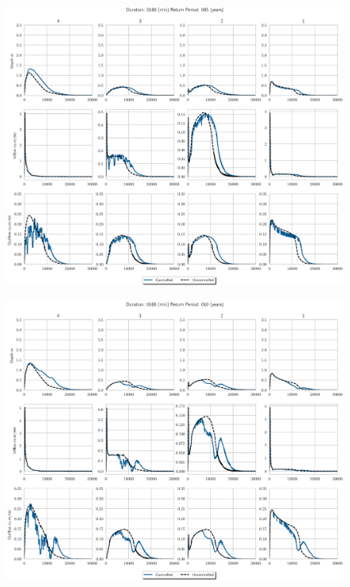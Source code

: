 \begin{figure}
    \centering
    \includegraphics[width=\linewidth]{./RL-SI-figures/77storms/0180005.eps}
\end{figure}
\begin{figure}
    \centering
    \includegraphics[width=\linewidth]{./RL-SI-figures/77storms/0180010.eps}
\end{figure}
